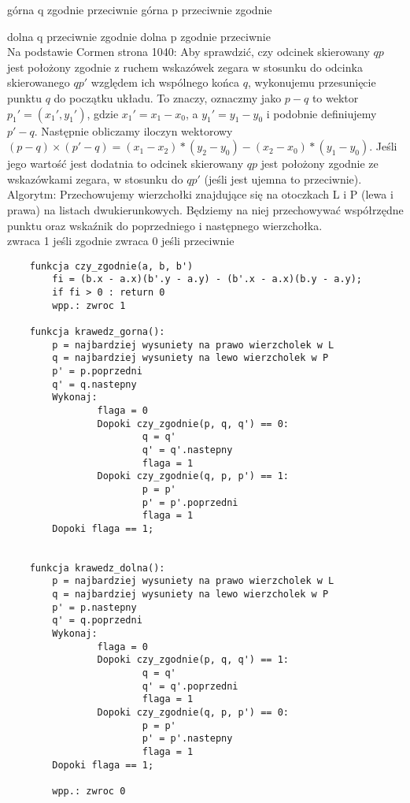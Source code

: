 \documentclass[12pt]{article}
\begin{document}
górna q 	zgodnie 	przeciwnie
górna p 	przeciwnie 	zgodnie
		
dolna q 	przeciwnie 	zgodnie
dolna p 	zgodnie 	przeciwnie\\


Na podstawie Cormen strona 1040:
Aby sprawdzić, czy odcinek skierowany $qp$ jest położony zgodnie z ruchem wskazówek zegara w stosunku do odcinka skierowanego $qp'$ względem ich wspólnego końca $q$, wykonujemu przesunięcie punktu $q$ do początku układu. To znaczy, oznaczmy jako $p-q$ to wektor $p_{1}'= (x_{1}', y_{1}')$, gdzie $x_{1}'=x_{1}-x_{0}$, a $y_{1}'=y_{1}-y_{0}$ i podobnie definiujemy $p'-q$. Następnie obliczamy iloczyn wektorowy $(p-q)\times(p'-q)=(x_{1}-x_{2})*(y_{2}-y_{0})-(x_{2}-x_{0})*(y_{1}-y_{0})$. Jeśli jego wartość jest dodatnia to odcinek skierowany $qp$ jest położony zgodnie ze wskazówkami zegara, w stosunku do $qp'$ (jeśli jest ujemna to przeciwnie).\\

Algorytm:
Przechowujemy wierzchołki znajdujące się na otoczkach L i P (lewa i prawa) na listach dwukierunkowych. Będziemy na niej przechowywać współrzędne punktu oraz wskaźnik do poprzedniego i następnego wierzchołka.\\

zwraca 1 jeśli zgodnie
zwraca 0 jeśli przeciwnie
\begin{lstlisting}
    funkcja czy_zgodnie(a, b, b')
        fi = (b.x - a.x)(b'.y - a.y) - (b'.x - a.x)(b.y - a.y);
        if fi > 0 : return 0
        wpp.: zwroc 1

    funkcja krawedz_gorna():
        p = najbardziej wysuniety na prawo wierzcholek w L
        q = najbardziej wysuniety na lewo wierzcholek w P
        p' = p.poprzedni
        q' = q.nastepny
        Wykonaj:    
                flaga = 0
                Dopoki czy_zgodnie(p, q, q') == 0:
                        q = q'
                        q' = q'.nastepny
                        flaga = 1
                Dopoki czy_zgodnie(q, p, p') == 1:
                        p = p'
                        p' = p'.poprzedni
                        flaga = 1        
        Dopoki flaga == 1;
        

    funkcja krawedz_dolna():
        p = najbardziej wysuniety na prawo wierzcholek w L
        q = najbardziej wysuniety na lewo wierzcholek w P
        p' = p.nastepny
        q' = q.poprzedni
        Wykonaj:    
                flaga = 0
                Dopoki czy_zgodnie(p, q, q') == 1:
                        q = q'
                        q' = q'.poprzedni
                        flaga = 1
                Dopoki czy_zgodnie(q, p, p') == 0:
                        p = p'
                        p' = p'.nastepny
                        flaga = 1        
        Dopoki flaga == 1;
        
        wpp.: zwroc 0
\end{lstlisting}
\end{document}
